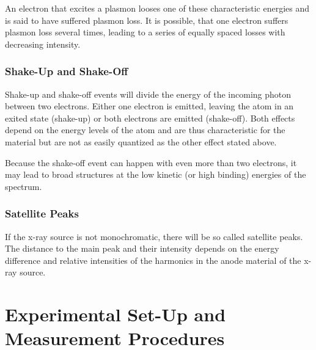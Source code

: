 \documentclass[a4paper]{scrartcl}
\numberwithin{equation}{section}
\numberwithin{figure}{section}
\numberwithin{table}{section}
\begin{document}
An electron that excites a plasmon looses one of these characteristic energies and is said to have suffered plasmon loss. It is possible, that one electron suffers plasmon loss several times, leading to a series of equally spaced losses with decreasing intensity.


\subsubsection{Shake-Up and Shake-Off}
Shake-up and shake-off events will divide the energy of the incoming photon between two electrons. Either one electron is emitted, leaving the atom in an exited state (shake-up) or both electrons are emitted (shake-off). Both effects depend on the energy levels of the atom and are thus characteristic for the material but are not as easily quantized as the other effect stated above.

Because the shake-off event can happen with even more than two electrons, it may lead to broad structures at the low kinetic (or high binding) energies of the spectrum.


\subsubsection{Satellite Peaks}
If the x-ray source is not monochromatic, there will be so called satellite peaks. The distance to the main peak and their intensity depends on the energy difference and relative intensities of the harmonics in the anode material of the x-ray source.




\section{Experimental Set-Up and Measurement Procedures}
\FloatBarrier
\end{document}
